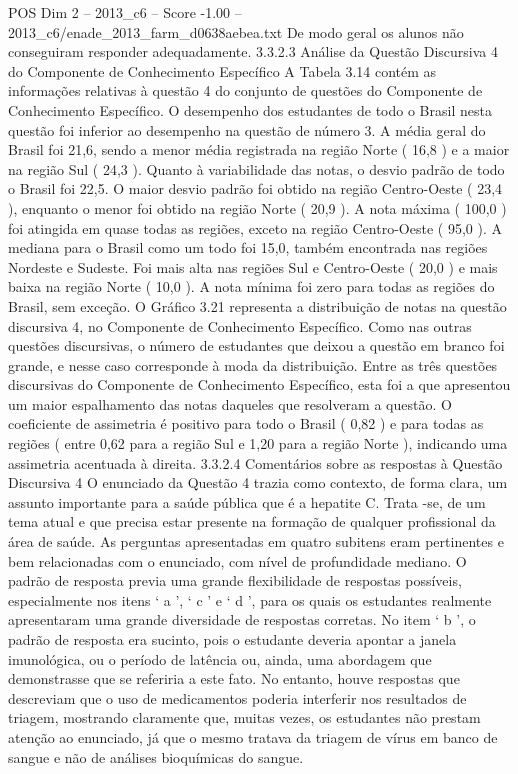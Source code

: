 \begin{textsample}{POS Dim 2 – 2013\_c6 – Score -1.00 – 2013\_c6/enade\_2013\_farm\_d0638aebea.txt}
De modo geral os alunos não conseguiram responder adequadamente. 3.3.2.3 Análise da Questão Discursiva 4 do Componente de Conhecimento Específico A Tabela 3.14 contém as informações relativas à questão 4 do conjunto de questões do Componente de Conhecimento Específico.
O desempenho dos estudantes de todo o Brasil nesta questão foi inferior ao desempenho na questão de número 3.
A média geral do Brasil foi 21,6, sendo a menor média registrada na região Norte ( 16,8 ) e a maior na região Sul ( 24,3 ).
Quanto à variabilidade das notas, o desvio padrão de todo o Brasil foi 22,5.
O maior desvio padrão foi obtido na região Centro-Oeste ( 23,4 ), enquanto o menor foi obtido na região Norte ( 20,9 ).
A nota máxima ( 100,0 ) foi atingida em quase todas as regiões, exceto na região Centro-Oeste ( 95,0 ).
A mediana para o Brasil como um todo foi 15,0, também encontrada nas regiões Nordeste e Sudeste.
Foi mais alta nas regiões Sul e Centro-Oeste ( 20,0 ) e mais baixa na região Norte ( 10,0 ).
A nota mínima foi zero para todas as regiões do Brasil, sem exceção.
O Gráfico 3.21 representa a distribuição de notas na questão discursiva 4, no Componente de Conhecimento Específico.
Como nas outras questões discursivas, o número de estudantes que deixou a questão em branco foi grande, e nesse caso corresponde à moda da distribuição.
Entre as três questões discursivas do Componente de Conhecimento Específico, esta foi a que apresentou um maior espalhamento das notas daqueles que resolveram a questão.
O coeficiente de assimetria é positivo para todo o Brasil ( 0,82 ) e para todas as regiões ( entre 0,62 para a região Sul e 1,20 para a região Norte ), indicando uma assimetria acentuada à direita. 3.3.2.4 Comentários sobre as respostas à Questão Discursiva 4 O enunciado da Questão 4 trazia como contexto, de forma clara, um assunto importante para a saúde pública que é a hepatite C.
Trata -se, de um tema atual e que precisa estar presente na formação de qualquer profissional da área de saúde.
As perguntas apresentadas em quatro subitens eram pertinentes e bem relacionadas com o enunciado, com nível de profundidade mediano.
O padrão de resposta previa uma grande flexibilidade de respostas possíveis, especialmente nos itens ‘ a ’, ‘ c ’ e ‘ d ’, para os quais os estudantes realmente apresentaram uma grande diversidade de respostas corretas.
No item ‘ b ’, o padrão de resposta era sucinto, pois o estudante deveria apontar a janela imunológica, ou o período de latência ou, ainda, uma abordagem que demonstrasse que se referiria a este fato.
No entanto, houve respostas que descreviam que o uso de medicamentos poderia interferir nos resultados de triagem, mostrando claramente que, muitas vezes, os estudantes não prestam atenção ao enunciado, já que o mesmo tratava da triagem de vírus em banco de sangue e não de análises bioquímicas do sangue.

\end{textsample}
